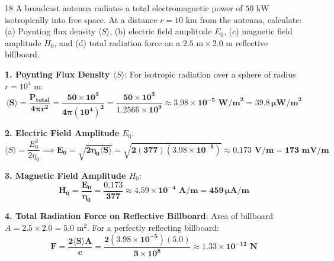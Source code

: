\begin{theoryq}{18}
A broadcast antenna radiates a total electromagnetic power of $50\text{ kW}$ isotropically into free space. At a distance $r = 10\text{ km}$ from the antenna, calculate: (a) Poynting flux density $\langle S \rangle$, (b) electric field amplitude $E_0$, (c) magnetic field amplitude $H_0$, and (d) total radiation force on a $2.5\text{ m} \times 2.0\text{ m}$ reflective billboard.
\end{theoryq}
\begin{theorysol}
\textbf{1. Poynting Flux Density $\langle S \rangle$}:
For isotropic radiation over a sphere of radius $r = 10^4\text{ m}$:
\begin{equation}
\mathbf{\langle S \rangle = \frac{P_{\text{total}}}{4\pi r^2} = \frac{50 \times 10^3}{4\pi (10^4)^2} = \frac{50 \times 10^3}{1.2566 \times 10^9} \approx 3.98 \times 10^{-5}\text{ W/m}^2 = 39.8\,\mu\text{W/m}^2}
\end{equation}

\textbf{2. Electric Field Amplitude $E_0$}:
\begin{equation}
\langle S \rangle = \frac{E_0^2}{2\eta_0} \implies \mathbf{E_0 = \sqrt{2\eta_0 \langle S \rangle} = \sqrt{2(377)(3.98 \times 10^{-5})} \approx 0.173\text{ V/m} = 173\text{ mV/m}}
\end{equation}

\textbf{3. Magnetic Field Amplitude $H_0$}:
\begin{equation}
\mathbf{H_0 = \frac{E_0}{\eta_0} = \frac{0.173}{377} \approx 4.59 \times 10^{-4}\text{ A/m} = 459\,\mu\text{A/m}}
\end{equation}

\textbf{4. Total Radiation Force on Reflective Billboard}:
Area of billboard $A = 2.5 \times 2.0 = 5.0\text{ m}^2$.
For a perfectly reflecting billboard:
\begin{equation}
\mathbf{F = \frac{2\langle S \rangle A}{c} = \frac{2(3.98 \times 10^{-5})(5.0)}{3 \times 10^8} \approx 1.33 \times 10^{-12}\text{ N}}
\end{equation}
\end{theorysol}
\vspace{4mm}

